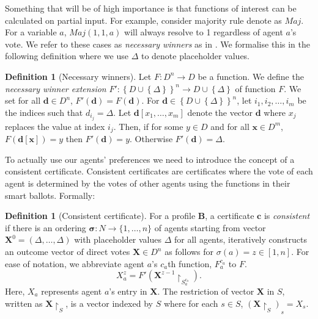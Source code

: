 \documentclass[11pt,a4paper, titlepage]{article}
\theoremstyle{definition}
\newtheorem{definition}[theorem]{Definition}
\let\vec\mathbf
\begin{document}
Something that will be of high importance is that functions of interest can be calculated on partial input.  
For example, consider majority rule denote as $\mathit{Maj}$. For a variable $a$, $\mathit{Maj}(1, 1, a)$ will always resolve to 1 regardless of agent $a$'s vote. 
We refer to these cases as \emph{necessary winners} as in \citet{konczak2005voting}.
We formalise this in the following definition where we use $\Delta$ to denote placeholder values.

\begin{definition}[Necessary winners]
    Let $F \colon D^n \longrightarrow D $ be a function.
    We define the \emph{necessary winner extension} $F' \colon \left\{D \cup \left\{\Delta\right\}\right\}^n \longrightarrow D \cup \left\{\Delta\right\}$ of function $F$. 
    We set for all $\vec{d} \in D^n$, $F'(\vec{d}) = F(\vec{d})$.
    For $\vec{d} \in \left\{D \cup \left\{\Delta\right\}\right\}^n$, let $i_1, i_2, \ldots, i_m$ be the indices such that $d_{i_j} = \Delta$.
    Let $\vec{d}[x_1, \ldots, x_m]$ denote the vector $\vec{d}$ where $x_j$ replaces the value at index $i_j$. Then, if for some $y \in D$ and for all $\vec{x} \in D^m$, $F(\vec{d}[\vec{x}]) = y$ then $F'(\vec{d}) = y$.
    Otherwise $F'(\vec{d}) = \Delta$.
\end{definition}

To actually use our agents' preferences we need to introduce the concept of a consistent certificate. 
Consistent certificates are certificates where the vote of each agent is determined by the votes of other agents using the functions in their smart ballots. Formally:

\begin{definition}[Consistent certificate]
    For a profile $\mathbf{B}$, a certificate $\mathbf{c}$ is \emph{consistent} if there is an ordering $\mathbf{\sigma} \colon N \longrightarrow \{1,\ldots, n\}$ of agents starting from vector $\vec{X}^0 = (\Delta, \ldots, \Delta)$ with placeholder values $\Delta$ for all agents, iteratively constructs an outcome vector of direct votes $\vec{X} \in D^n$ as follows for $\sigma(a) = z \in [1,n]$. For ease of notation, we abbreviate agent $a$'s $c_a$th function, $F_a^{c_a}$ to $F$.
    \[
        X^z_a = F'(\vec{X}^{z-1} \restriction_{S^{c_a}_a} ).
    \]
    Here, $X_a$ represents agent $a$'s entry in $\vec{X}$. 
    The restriction of vector $\vec{X}$ in $S$, written as $\vec{X} \restriction_S$, is a vector indexed by $S$ where for each $s \in S$,  $(\vec{X} \restriction_S)_s = X_s$.


\end{definition}
\end{document}
